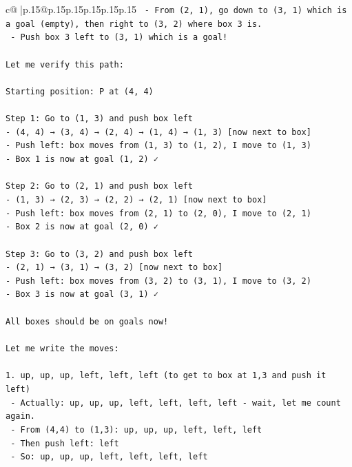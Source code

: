 \documentclass{article}
\begin{document}
{\begin{supertabular}{c@{$\;$}|p{.15\linewidth}@{}p{.15\linewidth}p{.15\linewidth}p{.15\linewidth}p{.15\linewidth}p{.15\linewidth}}
{{{\texttt{   {-} From (2, 1), go down to (3, 1) which is a goal (empty), then right to (3, 2) where box 3 is.} \\
\texttt{   {-} Push box 3 left to (3, 1) which is a goal!} \\
\\ 
\texttt{Let me verify this path:} \\
\\ 
\texttt{Starting position: P at (4, 4)} \\
\\ 
\texttt{Step 1: Go to (1, 3) and push box left} \\
\texttt{{-} (4, 4) → (3, 4) → (2, 4) → (1, 4) → (1, 3) {[}now next to box{]}} \\
\texttt{{-} Push left: box moves from (1, 3) to (1, 2), I move to (1, 3)} \\
\texttt{{-} Box 1 is now at goal (1, 2) ✓} \\
\\ 
\texttt{Step 2: Go to (2, 1) and push box left} \\
\texttt{{-} (1, 3) → (2, 3) → (2, 2) → (2, 1) {[}now next to box{]}} \\
\texttt{{-} Push left: box moves from (2, 1) to (2, 0), I move to (2, 1)} \\
\texttt{{-} Box 2 is now at goal (2, 0) ✓} \\
\\ 
\texttt{Step 3: Go to (3, 2) and push box left} \\
\texttt{{-} (2, 1) → (3, 1) → (3, 2) {[}now next to box{]}} \\
\texttt{{-} Push left: box moves from (3, 2) to (3, 1), I move to (3, 2)} \\
\texttt{{-} Box 3 is now at goal (3, 1) ✓} \\
\\ 
\texttt{All boxes should be on goals now!} \\
\\ 
\texttt{Let me write the moves:} \\
\\ 
\texttt{1. up, up, up, left, left, left (to get to box at 1,3 and push it left)} \\
\texttt{   {-} Actually: up, up, up, left, left, left, left {-} wait, let me count again.} \\
\texttt{   {-} From (4,4) to (1,3): up, up, up, left, left, left} \\
\texttt{   {-} Then push left: left} \\
\texttt{   {-} So: up, up, up, left, left, left, left} \\
}}}
\end{supertabular}}
\end{document}
